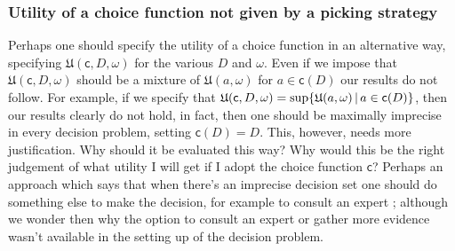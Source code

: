 \documentclass[a4paper]{article}
\newcommand\U{\mathfrak{U}} %
\renewcommand\c{\mathsf{c}} %
\newcommand{\todoold}[2][]{\todo[backgroundcolor=white,bordercolor=orange!10,linecolor=gray!10, #1,caption={},textcolor=gray]{Pre-rev: #2}}
\newcommand\SetDelimiter[1][]{
	\nonscript\,#1\vert \allowbreak \nonscript\,\mathopen{}}
\providecommand\given{\SetDelimiter}
\newenvironment{CCM rewritten}
{\begingroup\color{blue}} %
{\endgroup}              %
\begin{document}
%
%
%
%
\subsubsection{Utility of a choice function not given by a picking strategy}

Perhaps one should specify the utility of a choice function in an alternative way, specifying $\U(\c,D,\omega)$ for the various $D$ and $\omega$. 
Even if we impose that $\U(\c,D,\omega)$ should be a mixture of $\U(a,\omega)$ for $a\in\c(D)$ our results do not follow. For example, if we specify that $\U(\c,D,\omega)=\sup\{\U(a,\omega)\given a\in \c(D)\}$, then our results clearly do not hold, in fact, then one should be maximally imprecise in every decision problem, setting $\c(D)=D$. 
This, however, needs more justification. Why should it be evaluated this way?
Why would this be the right judgement of what utility I will get if I adopt the choice function $\c$?
Perhaps an approach which says that when there's an imprecise decision set one should do something else to make the decision, for example to consult an expert \citep{de2014efficient}; although we wonder then why the option to consult an expert or gather more evidence wasn't available in the setting up of the decision problem. 
\end{document}
